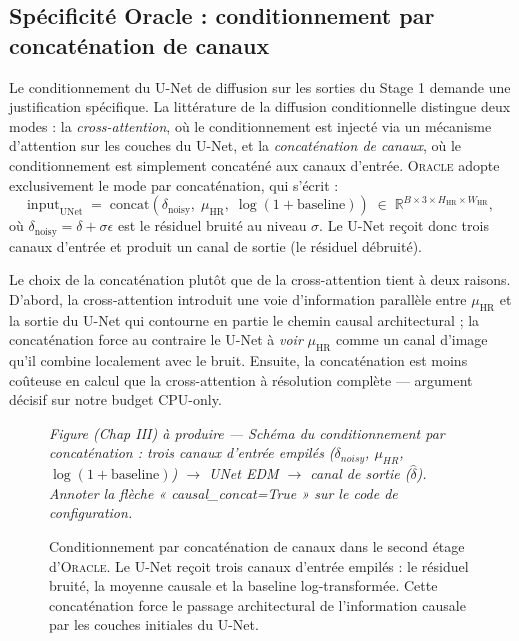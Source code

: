 \documentclass[14pt,a4paper,openany]{extreport}
\theoremstyle{definition}
\newcommand{\Oracle}{\textsc{Oracle}}
\newcommand{\HR}{\ensuremath{\text{HR}}}
\newcommand{\muHR}{\ensuremath{\mu_{\HR}}}
\newcommand{\figplaceholder}[2][0.9\linewidth]{%
  \begin{tcolorbox}[width=#1,height=5cm,valign=center,colback=gray!8,colframe=gray!45,arc=2pt,boxrule=0.5pt]
    \centering\small\textit{#2}
  \end{tcolorbox}%
}
\begin{document}
\subsection{Spécificité Oracle : conditionnement par concaténation de canaux}
\label{ssec:oracle-causal-concat}

Le conditionnement du U-Net de diffusion sur les sorties du Stage 1 demande une justification spécifique. La littérature de la diffusion conditionnelle distingue deux modes : la \emph{cross-attention}, où le conditionnement est injecté via un mécanisme d'attention sur les couches du U-Net, et la \emph{concaténation de canaux}, où le conditionnement est simplement concaténé aux canaux d'entrée. \Oracle{} adopte exclusivement le mode par concaténation, qui s'écrit :
\begin{equation}
  \mathrm{input}_{\mathrm{UNet}} \;=\; \mathrm{concat}\!\left( \delta_{\mathrm{noisy}},\; \muHR,\; \log(1 + \mathrm{baseline}) \right) \;\in\; \mathbb{R}^{B \times 3 \times H_{\HR} \times W_{\HR}},
  \label{eq:causal-concat}
\end{equation}
où $\delta_{\mathrm{noisy}} = \delta + \sigma \epsilon$ est le résiduel bruité au niveau $\sigma$. Le U-Net reçoit donc trois canaux d'entrée et produit un canal de sortie (le résiduel débruité).

Le choix de la concaténation plutôt que de la cross-attention tient à deux raisons. D'abord, la cross-attention introduit une voie d'information parallèle entre $\muHR$ et la sortie du U-Net qui contourne en partie le chemin causal architectural ; la concaténation force au contraire le U-Net à \emph{voir} $\muHR$ comme un canal d'image qu'il combine localement avec le bruit. Ensuite, la concaténation est moins coûteuse en calcul que la cross-attention à résolution complète --- argument décisif sur notre budget CPU-only.

\begin{figure}[ht]
  \centering
  \figplaceholder[0.9\linewidth]{Figure (Chap III) à produire --- Schéma du conditionnement par concaténation : trois canaux d'entrée empilés ($\delta_{noisy}$, $\mu_{HR}$, $\log(1+\text{baseline})$) $\to$ UNet EDM $\to$ canal de sortie ($\hat{\delta}$). Annoter la flèche « causal\_concat=True » sur le code de configuration.}
  \caption{Conditionnement par concaténation de canaux dans le second étage d'\Oracle{}. Le U-Net reçoit trois canaux d'entrée empilés : le résiduel bruité, la moyenne causale et la baseline log-transformée. Cette concaténation force le passage architectural de l'information causale par les couches initiales du U-Net.}
  \label{fig:causal-concat}
\end{figure}
\end{document}
